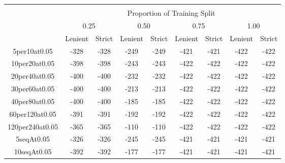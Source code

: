 \documentclass[12pt]{article}
\begin{document}
\begin{table}[h]
    \begin{tabular}{|c|cc|cc|cc|cc|}
        \hline \\
        \textbf{}       & \multicolumn{8}{c|}{Proportion of Training Split}                                                                                                        \\
                        & \multicolumn{2}{c}{0.25}            & \multicolumn{2}{c}{0.50}            & \multicolumn{2}{c}{0.75}            & \multicolumn{2}{c|}{1.00}              \\ 
                        & \multicolumn{1}{c}{Lenient} & \multicolumn{1}{c}{Strict} & \multicolumn{1}{c}{Lenient} & \multicolumn{1}{c}{Strict} & \multicolumn{1}{c}{Lenient} & \multicolumn{1}{c}{Strict} & \multicolumn{1}{c}{Lenient} & \multicolumn{1}{c|}{Strict} \\ \hline
        5per10at0.05    & -328          & -328          & -249          & -249          & -421          & -421          & -422           & -422           \\
        10per20at0.05   & -398          & -398          & -243          & -243          & -422          & -422          & -422           & -422           \\
        20per40at0.05   & -400          & -400          & -232          & -232          & -422          & -422          & -422           & -422           \\
        30per60at0.05   & -400          & -400          & -213          & -213          & -422          & -422          & -422           & -422           \\
        40per80at0.05   & -400          & -400          & -185          & -185          & -422          & -422          & -422           & -422           \\
        60per120at0.05  & -391          & -391          & -192          & -192          & -422          & -422          & -422           & -422           \\
        120per240at0.05 & -365          & -365          & -110          & -110          & -422          & -422          & -422           & -422           \\ \hline
        5seqAt0.05      & -326          & -326          & -245          & -245          & -421          & -421          & -421           & -421           \\ 
        10seqAt0.05     & -392          & -392          & -177          & -177          & -421          & -421          & -421           & -421           \\

\end{tabular}
\end{table}
\end{document}
